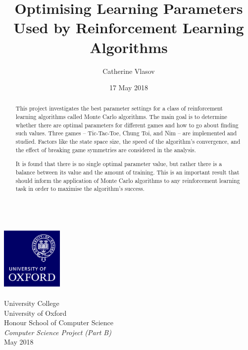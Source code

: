 \documentclass[11pt,a4paper]{report}
\author{Catherine Vlasov}
\title{Optimising Learning Parameters Used by Reinforcement Learning Algorithms}
\date{17 May 2018}
\begin{document}
\shipout\null

\makeatletter
	\begin{titlepage}
		\vspace*{\fill}
		\begin{center}
			{\huge \bfseries \@title }
			\\[20ex]
			\includegraphics[width=30mm]{oxlogo.png}
			\\[10ex]
			{\LARGE \@author}
			\\[3ex]
			{\Large University College}
			\\[1ex]
			{\Large University of Oxford}
			\\[8ex]
			{\Large Honour School of Computer Science}
			\\[1ex]
			{\Large \emph{Computer Science Project (Part B)}}
			\\[10ex]
			{\LARGE May 2018}
		\end{center}
		\vspace*{\fill}
	\end{titlepage}
\makeatother


\shipout\null


\begin{abstract}

This project investigates the best parameter settings for a class of reinforcement learning algorithms called Monte Carlo algorithms. The main goal is to determine whether there are optimal parameters for different games and how to go about finding such values. Three games -- Tic-Tac-Toe, Chung Toi, and Nim -- are implemented and studied. Factors like the state space size, the speed of the algorithm's convergence, and the effect of breaking game symmetries are considered in the analysis.

It is found that there is no single optimal parameter value, but rather there is a balance between its value and the amount of training. This is an important result that should inform the application of Monte Carlo algorithms to any reinforcement learning task in order to maximise the algorithm's success.

\end{abstract}
\end{document}
